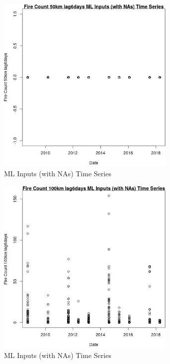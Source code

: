 \begin{figure} 
\centering  
\includegraphics[width=0.77\textwidth]{Code_Outputs/Report_ML_input_PM25_Step4_part_e_de_duplicated_aves_compiled_2019-05-18wNAs_Fire_Count_50km_lag6daysvDate.jpg} 
\caption{\label{fig:Report_ML_input_PM25_Step4_part_e_de_duplicated_aves_compiled_2019-05-18wNAsFire_Count_50km_lag6daysvDate}ML Inputs (with NAs) Time Series} 
\end{figure} 
 

\begin{figure} 
\centering  
\includegraphics[width=0.77\textwidth]{Code_Outputs/Report_ML_input_PM25_Step4_part_e_de_duplicated_aves_compiled_2019-05-18wNAs_Fire_Count_100km_lag6daysvDate.jpg} 
\caption{\label{fig:Report_ML_input_PM25_Step4_part_e_de_duplicated_aves_compiled_2019-05-18wNAsFire_Count_100km_lag6daysvDate}ML Inputs (with NAs) Time Series} 
\end{figure} 
 

